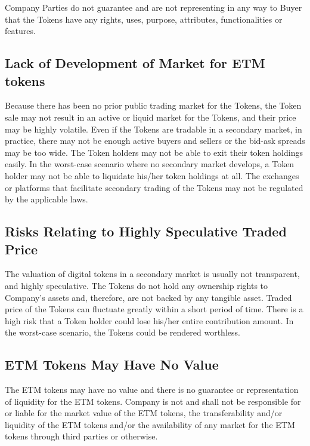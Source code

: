 \documentclass[12pt]{report}
\begin{document}
Company Parties do not guarantee and are not representing in any way to Buyer that the Tokens have any rights, uses, purpose, attributes, functionalities or features.

\subsection*{Lack of Development of Market for ETM tokens}
\label{risks-value-lack}
Because there has been no prior public trading market for the Tokens, the Token sale may not result in an active or liquid market for the Tokens, and their price may be highly volatile. Even if the Tokens are tradable in a secondary market, in practice, there may not be enough active buyers and sellers or the bid-ask spreads may be too wide. The Token holders may not be able to exit their token holdings easily. In the worst-case scenario where no secondary market develops, a Token holder may not be able to liquidate his/her token holdings at all. The exchanges or platforms that facilitate secondary trading of the Tokens may not be regulated by the applicable laws.

\subsection*{Risks Relating to Highly Speculative Traded Price}
\label{risks-value-speculative}
The valuation of digital tokens in a secondary market is usually not transparent, and highly speculative. The Tokens do not hold any ownership rights to Company’s assets and, therefore, are not backed by any tangible asset. Traded price of the Tokens can fluctuate greatly within a short period of time. There is a high risk that a Token holder could lose his/her entire contribution amount. In the worst-case scenario, the Tokens could be rendered worthless.

\subsection*{ETM Tokens May Have No Value}
\label{risks-value-no-value}
The ETM tokens may have no value and there is no guarantee or representation of liquidity for the ETM tokens. Company is not and shall not be responsible for or liable for the market value of the ETM tokens, the transferability and/or liquidity of the ETM tokens and/or the availability of any market for the ETM tokens through third parties or otherwise.
\end{document}

